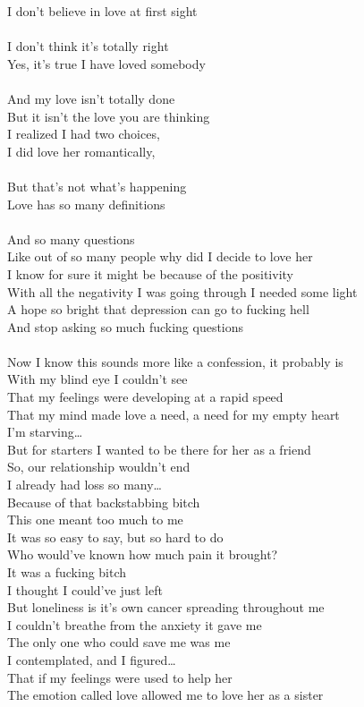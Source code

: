 \documentclass[12pt, b5paper]{article}
\begin{document}
I don’t believe in love at first sight 
\\\\I don’t think it's totally right 
\\Yes, it's true I have loved somebody
\\\\And my love isn’t totally done 
\\But it isn’t the love you are thinking 
\\I realized I had two choices, 
\\I did love her romantically, 
\\\\But that’s not what’s happening 
\\Love has so many definitions 
\\\\And so many questions 
\\Like out of so many people why did I decide to love her
\\I know for sure it might be because of the positivity 
\\With all the negativity I was going through I needed some light 
\\A hope so bright that depression can go to fucking hell
\\And stop asking so much fucking questions 
\\\\Now I know this sounds more like a confession, it probably is 
\\With my blind eye I couldn’t see
\\That my feelings were developing at a rapid speed 
\\That my mind made love a need, a need for my empty heart
\\I’m starving…
\\But for starters I wanted to be there for her as a friend
\\So, our relationship wouldn’t end 
\\I already had loss so many…
\\Because of that backstabbing bitch
\\This one meant too much to me 
\\It was so easy to say, but so hard to do
\\Who would’ve known how much pain it brought?
\\It was a fucking bitch
\\I thought I could’ve just left 
\\But loneliness is it's own cancer spreading throughout me 
\\I couldn’t breathe from the anxiety it gave me
\\The only one who could save me was me 
\\I contemplated, and I figured…
\\That if my feelings were used to help her
\\The emotion called love allowed me to love her as a sister
\end{document}
